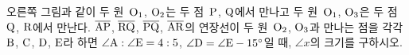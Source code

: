 \noindent\begin{minipage}[t]{0.58\linewidth}\vspace{0pt}\raggedright 오른쪽 그림과 같이 두 원~$\mathrm{O_1}$, $\mathrm{O_2}$는 두 점~$\mathrm{P}$, $\mathrm{Q}$에서 만나고 두 원~$\mathrm{O_1}$, $\mathrm{O_3}$은 두 점~$\mathrm{Q}$, $\mathrm{R}$에서 만난다. $\overline{\mathrm{AP}}$, $\overline{\mathrm{RQ}}$, $\overline{\mathrm{PQ}}$, $\overline{\mathrm{AR}}$의 연장선이 두 원~$\mathrm{O_2}$, $\mathrm{O_3}$과 만나는 점을 각각 $\mathrm{B}$, $\mathrm{C}$, $\mathrm{D}$, $\mathrm{E}$라 하면 $\angle\mathrm{A}:\angle\mathrm{E}=4:5$, $\angle\mathrm{D}=\angle\mathrm{E}-15^\circ$일 때, $\angle x$의 크기를 구하시오.\end{minipage}\hfill\begin{minipage}[t]{0.4\linewidth}\vspace{0pt}\centering \resizebox{\ifdim\width>\linewidth\linewidth\else\width\fi}{!}{}\end{minipage}\par
